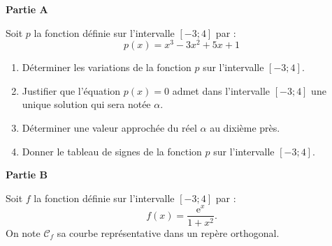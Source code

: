 \textbf{Partie A}

\medskip 

Soit $p$ la fonction définie sur l'intervalle $[-3;4]$ par : \[p(x) = x^3 - 3x^2 + 5x + 1\]%
%
\begin{enumerate}
	\item Déterminer les variations de la fonction $p$ sur l'intervalle $[-3;4]$.
	\item Justifier que l'équation $p(x) = 0$ admet dans l'intervalle $[-3;4]$ une unique solution qui sera notée $\alpha$.
	\item Déterminer une valeur approchée du réel $\alpha$ au dixième près.
	\item Donner le tableau de signes de la fonction $p$ sur l'intervalle $[-3;4]$.
\end{enumerate}

\textbf{Partie B}

\medskip 

Soit $f$ la fonction définie sur l'intervalle $[-3;4]$ par : \[f(x) = \dfrac{\text{e}^x}{1 + x^2}.\]%
%
On note $\mathcal{C}_f$ sa courbe représentative dans un repère orthogonal.

